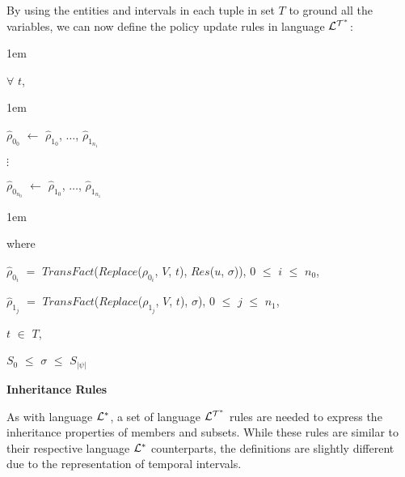 \documentclass[11pt]{report}
\newenvironment{vquote}
{
  \begin{list}{}{\leftmargin 1em}\item[]
}
{
  \end{list}
}
\begin{document}
\begin{itemize}
              \noindent
              By using the entities and intervals in each tuple in set $T$
              to ground all the variables, we can now define the policy
              update rules in language ${\cal L^{T^*}}$:

              \begin{vquote}
                $\forall$ $t$,
              \end{vquote}

              \begin{vquote}
                $\hat{\rho}_{0_0}$ $\leftarrow$
                $\hat{\rho}_{1_0}$, $\ldots$, $\hat{\rho}_{1_{n_1}}$

                $\vdots$

                $\hat{\rho}_{0_{n_0}}$ $\leftarrow$
                $\hat{\rho}_{1_0}$, $\ldots$, $\hat{\rho}_{1_{n_1}}$
              \end{vquote}

              \begin{vquote}
                where

                \hspace{1em}
                $\hat{\rho}_{0_i}$ $=$
                $TransFact$($Replace$($\rho_{0_i}$, $V$, $t$), $Res$($u$, $\sigma$)),
                $0$ $\leq$ $i$ $\leq$ $n_0$,

                \hspace{1em}
                $\hat{\rho}_{1_j}$ $=$
                $TransFact$($Replace$($\rho_{1_j}$, $V$, $t$), $\sigma$),
                $0$ $\leq$ $j$ $\leq$ $n_1$,

                \hspace{1em}
                $t$ $\in$ $T$,

                \hspace{1em}
                $S_0$ $\leq$ $\sigma$ $\leq$ $S_{|\psi|}$
              \end{vquote}

            \item
              {\bf Inheritance Rules}

                As with language ${\cal L^*}$, a set of language
                ${\cal L^{T^*}}$ rules are needed to express the inheritance
                properties of members and subsets. While these rules are
                similar to their respective language ${\cal L^*}$ counterparts,
                the definitions are slightly different due to the
                representation of temporal intervals.


\end{itemize}
\end{document}
